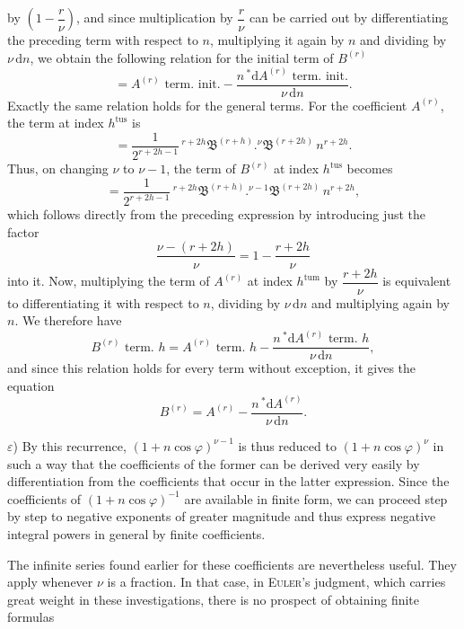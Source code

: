 by $\left(1-\dfrac{r}{\nu}\right)$, and since multiplication by $\dfrac{r}{\nu}$ can be carried out by
differentiating the preceding term with respect to $n$, multiplying it again by $n$ and dividing by $\nu\,\mathrm{d}n$,
we obtain the following relation for the initial term of $B^{(r)}$
\[
= A^{(r)}\text{ term. init.} - \frac{n\,{}^{*}\!\mathrm{d}A^{(r)}\text{ term. init.}}{\nu\,\mathrm{d}n}.
\]
Exactly the same relation holds for the general terms. For the coefficient
$A^{(r)}$, the term at index $h^{\mathrm{tus}}$ is
\[
= \frac{1}{2^{r+2h-1}}\,{}^{r+2h}\mathfrak{B}^{(r+h)} . {}^{\nu}\mathfrak{B}^{(r+2h)}\,n^{r+2h}.
\]
Thus, on changing $\nu$ to $\nu-1$, the term of $B^{(r)}$ at index $h^{\mathrm{tus}}$ becomes
\[
= \frac{1}{2^{r+2h-1}}\,{}^{r+2h}\mathfrak{B}^{(r+h)} . {}^{\nu-1}\mathfrak{B}^{(r+2h)}\,n^{r+2h},
\]
which follows directly from the preceding expression by introducing just the factor
\[
\frac{\nu-(r+2h)}{\nu} = 1 - \frac{r+2h}{\nu}
\]
into it. Now, multiplying the term of
$A^{(r)}$ at index $h^{\mathrm{tum}}$ by $\dfrac{r+2h}{\nu}$ is equivalent to differentiating it with respect to
$n$, dividing by $\nu\,\mathrm{d}n$ and multiplying again by $n$. We therefore have
\[
B^{(r)}\text{ term. }h = A^{(r)}\text{ term. }h - \frac{n\,{}^{*}\!\mathrm{d}A^{(r)}\text{ term. }h}{\nu\,\mathrm{d}n},
\]
and since this relation holds for every term without exception, it gives the equation
\[
B^{(r)} = A^{(r)} - \frac{n\,{}^{*}\!\mathrm{d}A^{(r)}}{\nu\,\mathrm{d}n}.
\]
\par\noindent\hspace*{\parindent}$\varepsilon$) By this recurrence, $(1+n\cos\varphi)^{\nu-1}$ is thus reduced to $(1+n\cos\varphi)^{\nu}$
in such a way that the coefficients of the former can be derived very easily by differentiation
from the coefficients that occur in the latter expression. Since the coefficients of $(1+n\cos\varphi)^{-1}$
are available in finite form, we can proceed step by step to negative exponents of greater magnitude
and thus express negative integral powers in general by finite coefficients.

The infinite series found earlier for these coefficients are nevertheless useful.
They apply whenever $\nu$ is a fraction. In that case, in \textsc{Euler}'s judgment, which carries great
weight in these investigations, there is no prospect of obtaining finite formulas
